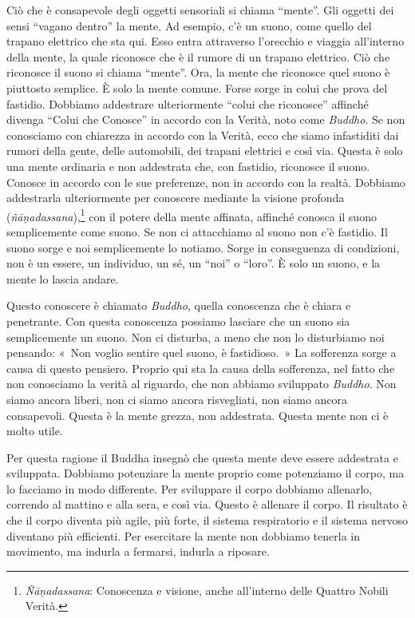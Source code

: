 Ciò che è consapevole degli oggetti sensoriali si chiama ``mente''. Gli
oggetti dei sensi ``vagano dentro'' la mente. Ad esempio, c'è un suono,
come quello del trapano elettrico che sta qui. Esso entra attraverso
l'orecchio e viaggia all'interno della mente, la quale riconosce che è
il rumore di un trapano elettrico. Ciò che riconosce il suono si chiama
``mente''. Ora, la mente che riconosce quel suono è piuttosto semplice.
È solo la mente comune. Forse sorge in colui che prova del fastidio.
Dobbiamo addestrare ulteriormente ``colui che riconosce'' affinché
divenga ``Colui che Conosce'' in accordo con la Verità, noto come
\emph{Buddho}. Se non conosciamo con chiarezza in accordo con la Verità,
ecco che siamo infastiditi dai rumori della gente, delle automobili, dei
trapani elettrici e così via. Questa è solo una mente ordinaria e non
addestrata che, con fastidio, riconosce il suono. Conosce in accordo con
le sue preferenze, non in accordo con la realtà. Dobbiamo addestrarla
ulteriormente per conoscere mediante la visione profonda
(\emph{ñāṇadassana}),\footnote{\emph{Ñāṇadassana}: Conoscenza e visione,
  anche all'interno delle Quattro Nobili Verità.} con il potere della
mente affinata, affinché conosca il suono semplicemente come suono. Se
non ci attacchiamo al suono non c'è fastidio. Il suono sorge e noi
semplicemente lo notiamo. Sorge in conseguenza di condizioni, non è un
essere, un individuo, un sé, un ``noi'' o ``loro''. È solo un suono, e
la mente lo lascia andare.

Questo conoscere è chiamato \emph{Buddho}, quella conoscenza che è
chiara e penetrante. Con questa conoscenza possiamo lasciare che un
suono sia semplicemente un suono. Non ci disturba, a meno che non lo
disturbiamo noi pensando: «~Non voglio sentire quel suono, è
fastidioso.~» La sofferenza sorge a causa di questo pensiero. Proprio
qui sta la causa della sofferenza, nel fatto che non conosciamo la
verità al riguardo, che non abbiamo sviluppato \emph{Buddho}. Non siamo
ancora liberi, non ci siamo ancora risvegliati, non siamo ancora
consapevoli. Questa è la mente grezza, non addestrata. Questa mente non
ci è molto utile.

Per questa ragione il Buddha insegnò che questa mente deve essere
addestrata e sviluppata. Dobbiamo potenziare la mente proprio come
potenziamo il corpo, ma lo facciamo in modo differente. Per sviluppare
il corpo dobbiamo allenarlo, correndo al mattino e alla sera, e così
via. Questo è allenare il corpo. Il risultato è che il corpo diventa più
agile, più forte, il sistema respiratorio e il sistema nervoso diventano
più efficienti. Per esercitare la mente non dobbiamo tenerla in
movimento, ma indurla a fermarsi, indurla a riposare.

